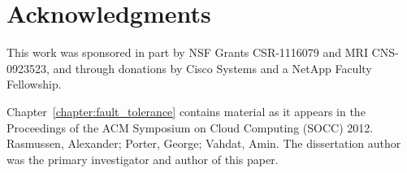 \section{Acknowledgments}

This work was sponsored in part by NSF Grants CSR-1116079 and MRI CNS-0923523,
and through donations by Cisco Systems and a NetApp Faculty Fellowship.

Chapter~\ref{chapter:fault_tolerance} contains material as it appears in the
Proceedings of the ACM Symposium on Cloud Computing (SOCC) 2012. Rasmussen,
Alexander; Porter, George; Vahdat, Amin. The dissertation author was the
primary investigator and author of this paper.


